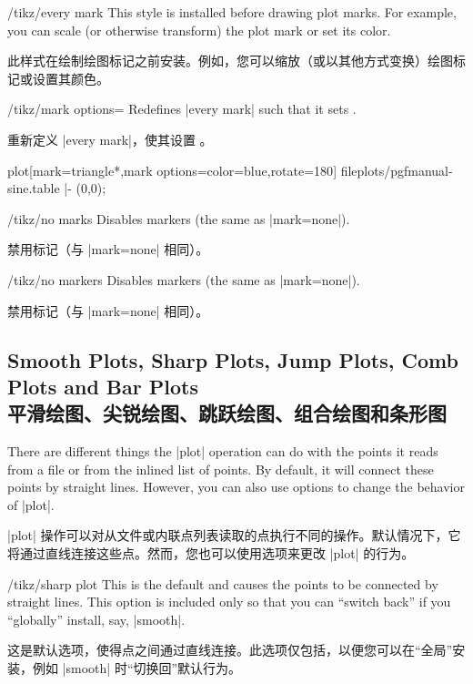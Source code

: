 \begin{stylekey}{/tikz/every mark}
    This style is installed before drawing plot marks. For example, you can
    scale (or otherwise transform) the plot mark or set its color.

    此样式在绘制绘图标记之前安装。例如，您可以缩放（或以其他方式变换）绘图标记或设置其颜色。

\end{stylekey}

\begin{key}{/tikz/mark options=}
    Redefines |every mark| such that it sets .
    
    重新定义 |every mark|，使其设置 。
\begin{codeexample}[]
\tikz \fill[fill=blue!20]
  plot[mark=triangle*,mark options={color=blue,rotate=180}]
    file{plots/pgfmanual-sine.table} |- (0,0);
\end{codeexample}
\end{key}

\begin{stylekey}{/tikz/no marks}
    Disables markers (the same as |mark=none|).

    禁用标记（与 |mark=none| 相同）。
\end{stylekey}
%
\begin{stylekey}{/tikz/no markers}
    Disables markers (the same as |mark=none|).

    禁用标记（与 |mark=none| 相同）。
\end{stylekey}


\subsection{Smooth Plots, Sharp Plots, Jump Plots, Comb Plots and Bar Plots\\平滑绘图、尖锐绘图、跳跃绘图、组合绘图和条形图}

There are different things the |plot| operation can do with the points it reads
from a file or from the inlined list of points. By default, it will connect
these points by straight lines. However, you can also use options to change the
behavior of |plot|.

|plot| 操作可以对从文件或内联点列表读取的点执行不同的操作。默认情况下，它将通过直线连接这些点。然而，您也可以使用选项来更改 |plot| 的行为。

\begin{key}{/tikz/sharp plot}
    This is the default and causes the points to be connected by straight
    lines. This option is included only so that you can ``switch back'' if you
    ``globally'' install, say, |smooth|.

    这是默认选项，使得点之间通过直线连接。此选项仅包括，以便您可以在“全局”安装，例如 |smooth| 时“切换回”默认行为。

\end{key}


